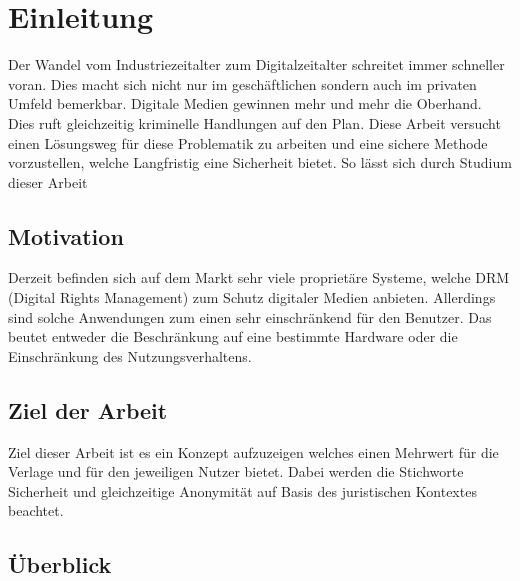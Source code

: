 \chapter{Einleitung}
\label{sec:einleitung}
\begin{spacing}{1.5}
Der Wandel vom Industriezeitalter zum Digitalzeitalter schreitet immer schneller voran. Dies macht sich nicht nur im geschäftlichen sondern auch im privaten Umfeld bemerkbar. Digitale Medien gewinnen mehr und mehr die Oberhand. Dies ruft gleichzeitig kriminelle Handlungen auf den Plan. 
Diese Arbeit versucht einen Lösungsweg für diese Problematik zu arbeiten und eine sichere Methode vorzustellen, welche Langfristig eine Sicherheit bietet.
So lässt sich durch Studium dieser Arbeit  

\end{spacing}


\section{Motivation}
\label{sec:Motivation}
\begin{spacing}{1.5}
Derzeit befinden sich auf dem Markt sehr viele proprietäre Systeme, welche DRM (Digital Rights Management) zum Schutz digitaler Medien anbieten. Allerdings sind solche Anwendungen zum einen sehr einschränkend für den Benutzer. Das beutet entweder die Beschränkung auf eine bestimmte Hardware oder die Einschränkung des Nutzungsverhaltens.  
\end{spacing}


\section{Ziel der Arbeit}
Ziel dieser Arbeit ist es ein Konzept aufzuzeigen welches einen Mehrwert für die Verlage und für den jeweiligen Nutzer bietet. Dabei werden die Stichworte Sicherheit und gleichzeitige Anonymität auf Basis des juristischen Kontextes beachtet. 
\label{sec:Ziel der Arbeit}
\begin{spacing}{1.5}

\end{spacing}


\section{Überblick}
\label{sec:Überblick}
\begin{spacing}{1.5}

\end{spacing}